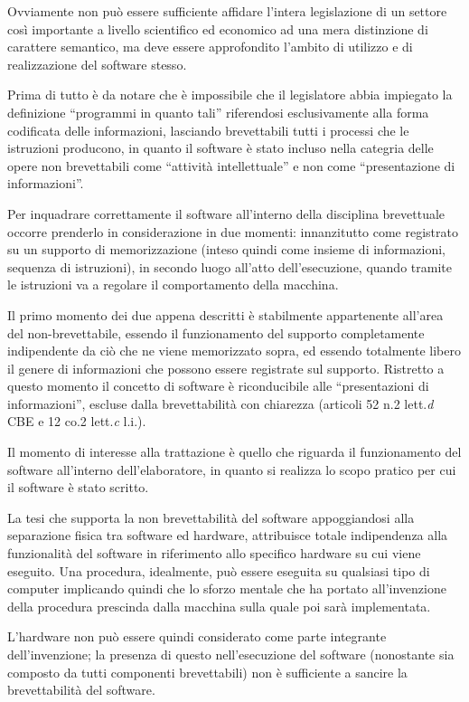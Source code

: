 Ovviamente non può essere sufficiente affidare l'intera legislazione di un settore così importante a livello scientifico ed economico ad una mera distinzione di carattere semantico, ma deve essere approfondito l'ambito di utilizzo e di realizzazione del software stesso.

Prima di tutto è da notare che è impossibile che il legislatore abbia impiegato la definizione ``programmi in quanto tali'' riferendosi esclusivamente alla forma codificata delle informazioni, lasciando brevettabili tutti i processi che le istruzioni producono, in quanto il software è stato incluso nella categria delle opere non brevettabili come ``attività intellettuale'' e non come ``presentazione di informazioni''.

Per inquadrare correttamente il software all'interno della disciplina brevettuale occorre prenderlo in considerazione in due momenti: innanzitutto come registrato su un supporto di memorizzazione (inteso quindi come insieme di informazioni, sequenza di istruzioni), in secondo luogo all'atto dell'esecuzione, quando tramite le istruzioni va a regolare il comportamento della macchina.

Il primo momento dei due appena descritti è stabilmente appartenente all'area del non-brevettabile, essendo il funzionamento del supporto completamente indipendente da ciò che ne viene memorizzato sopra, ed essendo totalmente libero il genere di informazioni che possono essere registrate sul supporto. Ristretto a questo momento il concetto di software è riconducibile alle ``presentazioni di informazioni'', escluse dalla brevettabilità con chiarezza (articoli 52 n.2 lett.\textit{d} CBE e 12 co.2 lett.\textit{c} l.i.).

Il momento di interesse alla trattazione è quello che riguarda il funzionamento del software all'interno dell'elaboratore, in quanto si realizza lo scopo pratico per cui il software è stato scritto.

La tesi che supporta la non brevettabilità del software appoggiandosi alla separazione fisica tra software ed hardware, attribuisce totale indipendenza alla funzionalità del software in riferimento allo specifico hardware su cui viene eseguito. Una procedura, idealmente, può essere eseguita su qualsiasi tipo di computer implicando quindi che lo sforzo mentale che ha portato all'invenzione della procedura prescinda dalla macchina sulla quale poi sarà implementata.

L'hardware non può essere quindi considerato come parte integrante dell'invenzione; la presenza di questo nell'esecuzione del software (nonostante sia composto da tutti componenti brevettabili) non è sufficiente a sancire la brevettabilità del software.

